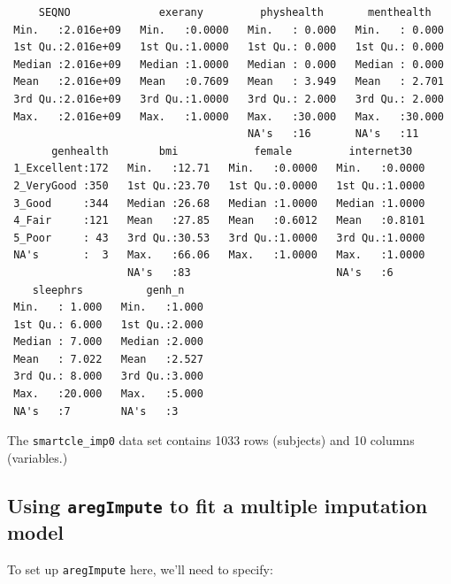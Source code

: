 \documentclass[]{book}
\theoremstyle{definition}
\theoremstyle{definition}
\theoremstyle{definition}
\theoremstyle{remark}
\begin{document}
\begin{verbatim}
     SEQNO              exerany         physhealth       menthealth    
 Min.   :2.016e+09   Min.   :0.0000   Min.   : 0.000   Min.   : 0.000  
 1st Qu.:2.016e+09   1st Qu.:1.0000   1st Qu.: 0.000   1st Qu.: 0.000  
 Median :2.016e+09   Median :1.0000   Median : 0.000   Median : 0.000  
 Mean   :2.016e+09   Mean   :0.7609   Mean   : 3.949   Mean   : 2.701  
 3rd Qu.:2.016e+09   3rd Qu.:1.0000   3rd Qu.: 2.000   3rd Qu.: 2.000  
 Max.   :2.016e+09   Max.   :1.0000   Max.   :30.000   Max.   :30.000  
                                      NA's   :16       NA's   :11      
       genhealth        bmi            female         internet30    
 1_Excellent:172   Min.   :12.71   Min.   :0.0000   Min.   :0.0000  
 2_VeryGood :350   1st Qu.:23.70   1st Qu.:0.0000   1st Qu.:1.0000  
 3_Good     :344   Median :26.68   Median :1.0000   Median :1.0000  
 4_Fair     :121   Mean   :27.85   Mean   :0.6012   Mean   :0.8101  
 5_Poor     : 43   3rd Qu.:30.53   3rd Qu.:1.0000   3rd Qu.:1.0000  
 NA's       :  3   Max.   :66.06   Max.   :1.0000   Max.   :1.0000  
                   NA's   :83                       NA's   :6       
    sleephrs          genh_n     
 Min.   : 1.000   Min.   :1.000  
 1st Qu.: 6.000   1st Qu.:2.000  
 Median : 7.000   Median :2.000  
 Mean   : 7.022   Mean   :2.527  
 3rd Qu.: 8.000   3rd Qu.:3.000  
 Max.   :20.000   Max.   :5.000  
 NA's   :7        NA's   :3      
\end{verbatim}

The \texttt{smartcle\_imp0} data set contains 1033 rows (subjects) and
10 columns (variables.)

\subsection{\texorpdfstring{Using \texttt{aregImpute} to fit a multiple
imputation
model}{Using aregImpute to fit a multiple imputation model}}\label{using-aregimpute-to-fit-a-multiple-imputation-model}

To set up \texttt{aregImpute} here, we'll need to specify:
\end{document}
